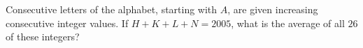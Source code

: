 Consecutive letters of the alphabet, starting with $A$, are given increasing consecutive integer values. If $H+K+L+N=2005$, what is the average of all $26$ of these integers?
